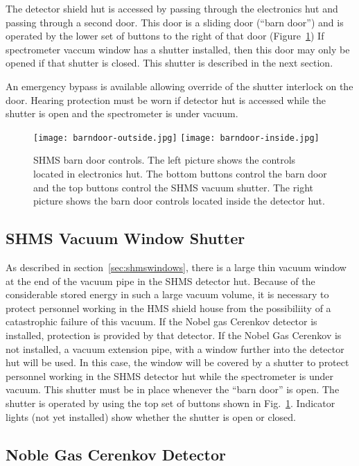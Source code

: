 The detector shield hut is accessed by passing through the electronics
hut and passing through a second door.  This door is a sliding door
(``barn door'') and is operated by the lower set of buttons to the
right of that door (Figure~\ref{fig:barndoorcontrol})  If spectrometer
vaccum window has a shutter installed, then this door may only be
opened if that shutter is closed.  This shutter is described in the
next section.

An emergency bypass is available allowing override of the shutter
interlock on the door.  Hearing protection must be worn if detector
hut is accessed while the shutter is open and the spectrometer is
under vacuum.

\begin{figure}
\begin{center}
\texttt{[image: barndoor-outside.jpg]}
\texttt{[image: barndoor-inside.jpg]}
\caption{\label{fig:barndoorcontrol}SHMS barn door controls.  The left
  picture shows the controls located in electronics hut.  The bottom
  buttons control the barn door and the top buttons control the SHMS
  vacuum shutter.  The right picture shows the barn door controls
  located inside the detector hut.}
\end{center}
\end{figure}

\subsection{SHMS Vacuum Window Shutter}
\label{sec:shmsshutter}
As described in section~\ref{sec:shmswindows}, there is a large thin
vacuum window at the end of the vacuum pipe in the SHMS detector hut.
Because of
the considerable stored energy in such a large vacuum volume, it is
necessary to protect personnel working in the HMS shield house from
the possibiliity of a catastrophic failure of this vacuum. 
If
the Nobel gas Cerenkov detector is installed, protection is provided
by that detector.
If the Nobel Gas Cerenkov is not installed, a vacuum
extension pipe, with a window further into the detector hut will be
used.  In this case, the window will be covered by a shutter to
protect personnel working in the SHMS detector hut while the
spectrometer is under vacuum.  This shutter must be in place whenever
the ``barn door'' is open.  The shutter is operated by using the top
set of buttons shown in Fig.~\ref{fig:barndoorcontrol}.  Indicator
lights (not yet installed) show whether the shutter is open or closed.


\subsection{Noble Gas Cerenkov Detector}




